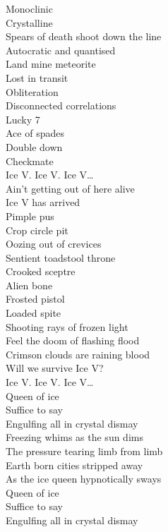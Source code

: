 Monoclinic \\
Crystalline \\
Spears of death shoot down the line \\
Autocratic and quantised \\
Land mine meteorite \\
Lost in transit \\
Obliteration \\
Disconnected correlations \\
Lucky 7 \\
Ace of spades \\
Double down \\
Checkmate \\

Ice V. Ice V. Ice V… \\

Ain't getting out of here alive \\
Ice V has arrived \\

Pimple pus \\
Crop circle pit \\
Oozing out of crevices \\
Sentient toadstool throne \\
Crooked sceptre \\
Alien bone \\
Frosted pistol \\
Loaded spite \\
Shooting rays of frozen light \\
Feel the doom of flashing flood \\
Crimson clouds are raining blood \\

Will we survive Ice V? \\

Ice V. Ice V. Ice V… \\

Queen of ice \\
Suffice to say \\
Engulfing all in crystal dismay \\
Freezing whims as the sun dims \\
The pressure tearing limb from limb \\
Earth born cities stripped away \\
As the ice queen hypnotically sways \\
Queen of ice \\
Suffice to say \\
Engulfing all in crystal dismay \\


